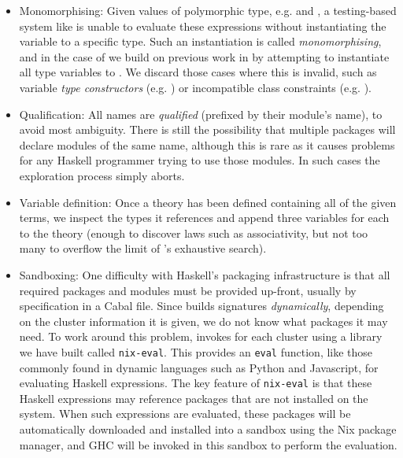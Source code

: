 \begin{itemize}
\item{Monomorphising}: Given values of polymorphic type, e.g.  and , a testing-based
  system like \quickspec{} is unable to evaluate these expressions without
  instantiating the variable  to a specific type. Such an instantiation is
  called \emph{monomorphising}, and in the case of \mlspec{} we build on
  previous work in \quickcheck{} by attempting to instantiate all type variables to
  . We discard those cases where this is invalid, such as variable
  \emph{type constructors} (e.g. ) or
  incompatible class constraints (e.g. ).

\item{Qualification}: All names are \emph{qualified} (prefixed by their module's
  name), to avoid most ambiguity. There is still the possibility that multiple
  packages will declare modules of the same name, although this is rare as it
  causes problems for any Haskell programmer trying to use those modules. In
  such cases the exploration process simply aborts.

\item{Variable definition}: Once a \quickspec{} theory has been defined containing
  all of the given terms, we inspect the types it references and append three
  variables for each to the theory (enough to discover laws such as
  associativity, but not too many to overflow the limit of \quickspec{}'s exhaustive
  search).

\item{Sandboxing}: One difficulty with Haskell's packaging infrastructure is
  that all required packages and modules must be provided up-front, usually by
  specification in a Cabal file. Since \mlspec{} builds signatures
  \emph{dynamically}, depending on the cluster information it is given, we do
  not know what packages it may need. To work around this problem,
  \mlspec{} invokes \quickspec{} for each cluster using a library we have
  built called \texttt{nix-eval}. This provides an \texttt{eval} function, like
  those commonly found in dynamic languages such as Python and Javascript, for
  evaluating Haskell expressions. The key feature of \texttt{nix-eval} is that
  these Haskell expressions may reference packages that are not installed on the
  system. When such expressions are evaluated, these packages will be
  automatically downloaded and installed into a sandbox using the Nix package
  manager, and GHC will be invoked in this sandbox to perform the evaluation.
\end{itemize}
